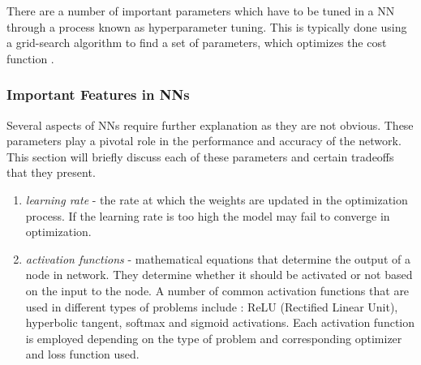 There are a number of important parameters which have to be tuned in a \ac{NN} through a process known as hyperparameter tuning. This is typically done
using a grid-search algorithm to find a set of parameters, which optimizes the
cost function \cite{LiDL2019}.

\subsubsection{Important Features in \ac{NN}s}
Several aspects of \ac{NN}s require further explanation as they are not obvious.
These parameters play a pivotal role in the performance and accuracy of the
network. This section will briefly discuss each of these parameters and certain
tradeoffs that they present.

\begin{enumerate}
  \item \emph{learning rate} - the rate at which the weights are updated in the
        optimization process. If the learning rate is too high the model may
        fail to converge in optimization.
  \item \emph{activation functions} - mathematical equations that determine the
        output of a node in network. They determine whether it should be
        activated or not based on the input to the node. A number of common
        activation functions that are used in different types of problems
        include : ReLU (Rectified Linear Unit), hyperbolic tangent, softmax
        and sigmoid activations. Each activation function is employed depending
        on the type of problem and corresponding optimizer and loss function
        used.


\end{enumerate}
